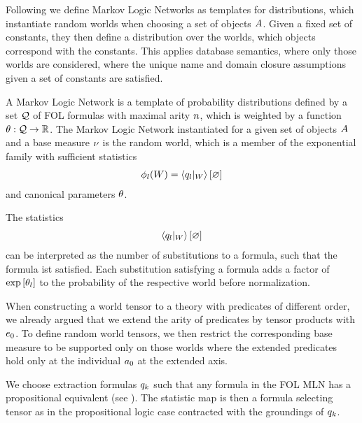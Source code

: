Following \cite{richardson_markov_2006} we define Markov Logic Networks as templates for distributions, which instantiate random worlds when choosing a set of objects $A$.
Given a fixed set of constants, they then define a distribution over the worlds, which objects correspond with the constants. %
This applies database semantics, where only those worlds are considered, where the unique name and domain closure assumptions given a set of constants are satisfied.


\begin{definition}
	A Markov Logic Network is a template of probability distributions defined by a set $\mathcal{Q}$ of FOL formulas with maximal arity $n$, which is weighted by a function $\theta:\mathcal{Q} \rightarrow \mathbb{R}$.
	The Markov Logic Network instantiated for a given set of objects $A$ and a base measure $\nu$ is the random world, which is a member of the exponential family with sufficient statistics
	\begin{align*}
		\sstat_{\selindex}(\dataworld)  = \sbcontraction{\groundingof{\folexformula_\selindex}} %
	\end{align*}
	and canonical parameters $\theta$.
\end{definition}

The statistics
	\begin{align*}
		\sbcontraction{\groundingof{\folexformula_\selindex}} %
	\end{align*}
can be interpreted as the number of substitutions to a formula, such that the formula ist satisfied.
Each substitution satisfying a formula adds a factor of $\mathrm{exp}\left[\theta_l\right]$ to the probability of the respective world before normalization.


%
When constructing a world tensor to a theory with predicates of different order, we already argued that we extend the arity of predicates by tensor products with $e_{0}$.
To define random world tensors, we then restrict the corresponding base measure to be supported only on those worlds where the extended predicates hold only at the individual $a_{0}$ at the extended axis.



We choose extraction formulas $q_{k}$ such that any formula in the FOL MLN has a propositional equivalent (see ).
The statistic map is then a formula selecting tensor as in the propositional logic case contracted with the groundings of $q_{k}$.




